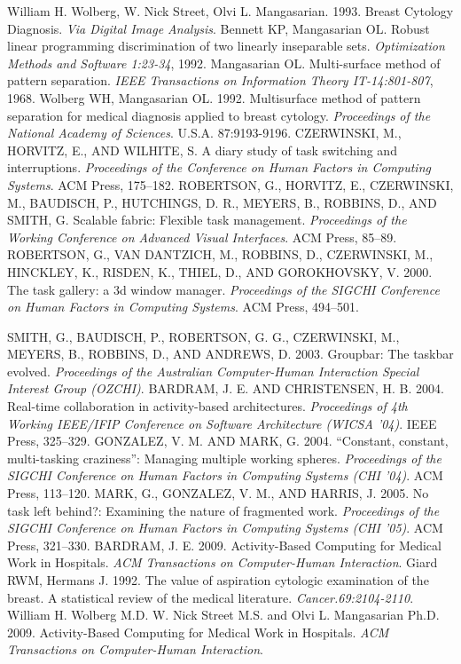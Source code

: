 \begin{thebibliography}{}
\bibitem{} William H. Wolberg, W. Nick Street, Olvi L. Mangasarian. 1993. Breast Cytology Diagnosis. \emph{Via Digital Image Analysis}.
\bibitem{} Bennett KP, Mangasarian OL. Robust linear programming discrimination of two linearly inseparable sets. \emph{Optimization Methods and Software 1:23-34}, 1992.
\bibitem{} Mangasarian OL. Multi-surface method of pattern separation. \emph{IEEE Transactions on Information Theory IT-14:801-807}, 1968.
\bibitem{} Wolberg WH, Mangasarian OL. 1992. Multisurface method of pattern separation for medical diagnosis applied to breast cytology. \emph{Proceedings of the National Academy of Sciences}. U.S.A. 87:9193-9196.
\bibitem{} CZERWINSKI, M., HORVITZ, E., AND WILHITE, S. A diary study of task switching and interruptions. \emph{Proceedings of the Conference on Human Factors in Computing Systems}. ACM Press, 175–182.
\bibitem{} ROBERTSON, G., HORVITZ, E., CZERWINSKI, M., BAUDISCH, P., HUTCHINGS, D. R., MEYERS, B., ROBBINS, D., AND SMITH, G. Scalable fabric: Flexible task management. \emph{Proceedings of the Working Conference on Advanced Visual Interfaces}. ACM Press, 85–89.
\bibitem{} ROBERTSON, G., VAN DANTZICH, M., ROBBINS, D., CZERWINSKI, M., HINCKLEY, K., RISDEN, K., THIEL, D., AND GOROKHOVSKY, V. 2000. The task gallery: a 3d window manager. \emph{Proceedings of the SIGCHI Conference on Human Factors in Computing Systems}. ACM Press, 494–501.

\clearpage

\bibitem{} SMITH, G., BAUDISCH, P., ROBERTSON, G. G., CZERWINSKI, M., MEYERS, B., ROBBINS, D., AND ANDREWS, D. 2003. Groupbar: The taskbar evolved. \emph{Proceedings of the Australian Computer-Human Interaction Special Interest Group (OZCHI)}.
\bibitem{} BARDRAM, J. E. AND CHRISTENSEN, H. B. 2004. Real-time collaboration in activity-based architectures. \emph{Proceedings of 4th Working IEEE/IFIP Conference on Software Architecture (WICSA ’04)}. IEEE Press, 325–329.
\bibitem{} GONZALEZ, V. M. AND MARK, G. 2004. “Constant, constant, multi-tasking craziness”: Managing multiple working spheres. \emph{Proceedings of the SIGCHI Conference on Human Factors in Computing Systems (CHI ’04)}. ACM Press, 113–120.
\bibitem{} MARK, G., GONZALEZ, V. M., AND HARRIS, J. 2005. No task left behind?: Examining the nature of fragmented work. \emph{Proceedings of the SIGCHI Conference on Human Factors in Computing Systems (CHI ’05)}. ACM Press, 321–330.
\bibitem{} BARDRAM, J. E. 2009. Activity-Based Computing for Medical Work in Hospitals. \emph{ACM Transactions on Computer-Human Interaction}.
\bibitem{} Giard RWM, Hermans J. 1992. The value of aspiration cytologic examination of the breast. A statistical review of the medical literature. \emph{Cancer.69:2104-2110}.
\bibitem{} William H. Wolberg M.D. W. Nick Street M.S. and Olvi L. Mangasarian Ph.D. 2009. Activity-Based Computing for Medical Work in Hospitals. \emph{ACM Transactions on Computer-Human Interaction}.


\end{thebibliography}
